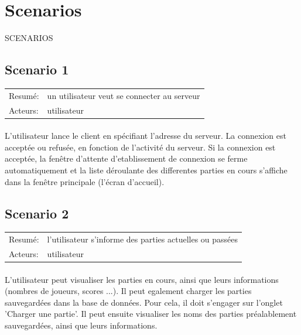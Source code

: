\documentclass[french,12pt]{report}
\begin{document}
\pagebreak

\section*{Scenarios}
{\uppercase{Scenarios}}

\subsection*{Scenario 1}

\begin{tabular}{ll}
  Resum\'e: & un utilisateur veut se connecter au serveur \\
  Acteurs: & utilisateur
\end{tabular}

\paragraph{}
  L'utilisateur lance le client en sp\'ecifiant l'adresse du serveur.
  La connexion est accept\'ee ou refus\'ee, en fonction de l'activit\'e 
du serveur. Si la connexion est accept\'ee, la fen\^etre d'attente 
d'etablissement de connexion se ferme automatiquement et la liste d\'eroulante 
des differentes parties en cours s'affiche dans la fen\^etre principale 
(l'\'ecran d'accueil).



\subsection*{Scenario 2}

\begin{tabular}{ll}
  Resum\'e: & l'utilisateur s'informe des parties actuelles ou pass\'ees \\
  Acteurs: & utilisateur
\end{tabular}

\paragraph{}
  L'utilisateur peut visualiser les parties en cours, ainsi que leurs 
informations (nombres de joueurs, scores ...).
  Il peut egalement charger les parties sauvegard\'ees dans la base de 
donn\'ees. Pour cela, il doit s'engager sur l'onglet 'Charger une partie'. 
Il peut ensuite visualiser les noms des parties pr\'ealablement 
sauvegard\'ees, ainsi que leurs informations.
\end{document}
